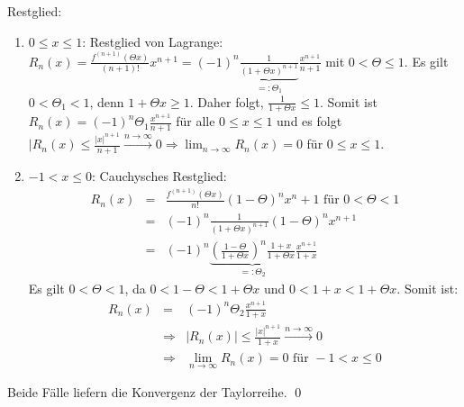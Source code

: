 \documentclass[ngerman,titlepage,twoside, parskip=half*]{scrreprt}
\theoremstyle{plain}
\theoremstyle{definition}
\theoremstyle{remark}
\begin{document}
Restglied:
\begin{enumerate}[1. F{a}ll]
  \item $0\leq x\leq 1$: Restglied von Lagrange:\\
    $R_n(x)=\frac{f^{(n+1)}(\Theta x)}{(n+1)!}x^{n+1}=(-1)^n
    \underbrace{\frac{1}{(1+\Theta x)^{n+1}}}_{=:\Theta_1}
    \frac{x^{n+1}}{n+1}$ mit $0<\Theta\leq 1$. Es gilt $0<\Theta_1<1$,
    denn $1+\Theta x\geq 1$. Daher folgt, $\frac{1}{1+\Theta x}\leq 1$.
    Somit ist $R_n(x)=(-1)^n\Theta_1\frac{x^{n+1}}{n+1}$ für alle
    $0\leq x\leq 1$ und es folgt $|R_n(x)\leq\frac{|x|^{n+1}}{n+1}
    \xrightarrow{n\rightarrow\infty} 0\Rightarrow\lim_{n\rightarrow\infty}
    R_n(x)=0$ für $0\leq x \leq 1$.
  \item $-1<x\leq 0$: Cauchysches Restglied:\\
    \begin{align*}
      R_n(x)&=& \frac{f^{(n+1)}(\Theta x)}{n!}(1-\Theta)^nx^n+1\text{ für }
      0<\Theta <1\\
      &=& (-1)^n\frac{1}{(1+\Theta x)^{n+1}}(1-\Theta)^nx^{n+1}\\
      &=& (-1)^n\underbrace{\left( \frac{1-\Theta}{1+\Theta x} \right)^n
      \frac{1+x}{1+\Theta x}}_{=:\Theta_2}\frac{x^{n+1}}{1+x}
    \end{align*}
    Es gilt $0<\Theta<1$, da $0<1-\Theta<1+\Theta x$ und $0<1+x<1+\Theta x$.
    Somit ist:
    \begin{align*}
      R_n(x)&=& (-1)^n\Theta_2\frac{x^{n+1}}{1+x}\\
      &\Rightarrow & |R_n(x)|\leq\frac{|x|^{n+1}}{1+x}\xrightarrow{n\rightarrow\infty} 0\\
      &\Rightarrow & \lim_{n\rightarrow\infty} R_n(x)=0\text{ für }
      -1<x\leq 0
    \end{align*}
\end{enumerate}
Beide Fälle liefern die Konvergenz der Taylorreihe.
\qed
\end{document}

